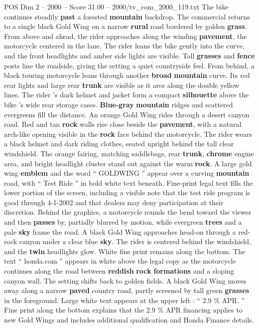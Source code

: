 \begin{textsample}{POS Dim 2 – 2000 – Score 31.00 – 2000/tv\_com\_2000\_119.txt}
The bike continues steadily \textbf{past} a forested \textbf{mountain} backdrop.
The commercial returns to a single black Gold Wing on a narrow \textbf{rural} road bordered by golden \textbf{grass}.
From above and ahead, the rider approaches along the winding \textbf{pavement}, the motorcycle centered in the lane.
The rider leans the bike gently into the curve, and the front headlights and amber side lights are visible.
Tall \textbf{grasses} and \textbf{fence} posts line the roadside, giving the setting a quiet countryside feel.
From behind, a black touring motorcycle leans through another \textbf{broad} \textbf{mountain} curve.
Its red rear lights and large rear \textbf{trunk} are visible as it arcs along the double yellow lines.
The rider ’s dark helmet and jacket form a compact \textbf{silhouette} above the bike ’s wide rear storage cases. \textbf{Blue-gray} \textbf{mountain} ridges and scattered evergreens fill the distance.
An orange Gold Wing rides through a desert canyon road.
Red and tan \textbf{rock} walls rise close beside the \textbf{pavement}, with a natural arch-like opening visible in the \textbf{rock} face behind the motorcycle.
The rider wears a black helmet and dark riding clothes, seated upright behind the tall clear windshield.
The orange fairing, matching saddlebags, rear \textbf{trunk}, \textbf{chrome} engine area, and bright headlight cluster stand out against the warm \textbf{rock}.
A large gold wing \textbf{emblem} and the word “ GOLDWING ” appear over a curving \textbf{mountain} road, with “ Test Ride ” in bold white text beneath.
Fine-print legal text fills the lower portion of the screen, including a visible note that the test ride program is good through 4-1-2002 and that dealers may deny participation at their discretion.
Behind the graphics, a motorcycle rounds the bend toward the viewer and then \textbf{passes} by, partially blurred by motion, while evergreen \textbf{trees} and a pale \textbf{sky} frame the road.
A black Gold Wing approaches head-on through a red-rock canyon under a clear blue \textbf{sky}.
The rider is centered behind the windshield, and the \textbf{twin} headlights glow.
White fine print remains along the bottom.
The text “ honda.com ” appears in white above the legal copy as the motorcycle continues along the road between \textbf{reddish} \textbf{rock} \textbf{formations} and a sloping canyon wall.
The setting shifts back to golden fields.
A black Gold Wing moves away along a narrow \textbf{paved} country road, partly screened by tall green \textbf{grasses} in the foreground.
Large white text appears at the upper left : “ 2.9 \% APR. ” Fine print along the bottom explains that the 2.9 \% APR financing applies to new Gold Wings and includes additional qualification and Honda Finance details.

\end{textsample}
